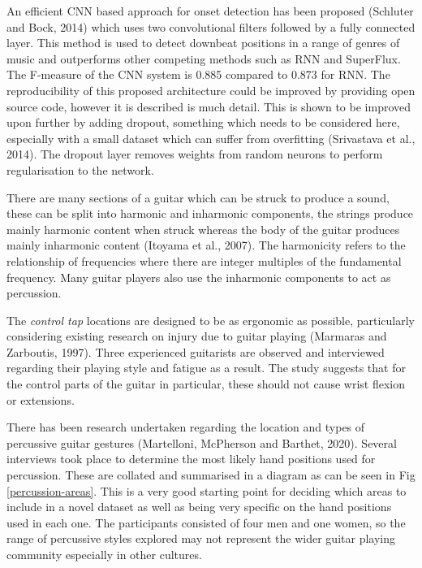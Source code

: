 \documentclass[conference]{IEEEtran}
\begin{document}
An efficient CNN based approach for onset detection has been proposed (Schluter and Bock, 2014) which uses two convolutional filters followed by a fully connected layer. This method is used to detect
downbeat positions in a range of genres of music and outperforms other competing methods such as RNN and SuperFlux. The F-measure of the CNN system is 0.885 compared to 0.873 for RNN. The reproducibility of 
this proposed architecture could be improved by providing open source code, however it is described is much detail. This
is shown to be improved upon further by adding dropout, something which needs to be considered here, especially with a small dataset which can suffer from overfitting (Srivastava et al., 2014). The dropout layer
removes weights from random neurons to perform regularisation to the network.

There are many sections of a guitar which can be struck to produce a sound, these can be split into harmonic and inharmonic components, the strings produce mainly harmonic content when
struck whereas the body of the guitar produces mainly inharmonic content (Itoyama et al., 2007). The harmonicity refers to the relationship of frequencies where there are integer multiples of the fundamental frequency.
Many guitar players also use the inharmonic components to act as percussion. 

The \emph{control tap} locations are designed to be as ergonomic as possible, particularly considering existing research on injury due to guitar playing (Marmaras and Zarboutis, 1997). Three experienced guitarists are observed and interviewed regarding their playing
style and fatigue as a result. The study suggests that for the control parts of the guitar in particular, these should not cause wrist flexion or extensions. 

There has been research undertaken regarding the location and types of percussive guitar gestures (Martelloni, McPherson and Barthet, 2020). Several interviews took place to determine the most likely hand positions used for percussion. These
are collated and summarised in a diagram as can be seen in Fig \ref{percussion-areas}. This is a very good starting point for deciding which areas to include in a novel dataset as well as being very specific on the hand positions used in each one.
The participants consisted of four men and one women, so the range of percussive styles explored may not represent the wider guitar playing community especially in other cultures. 
\end{document}
